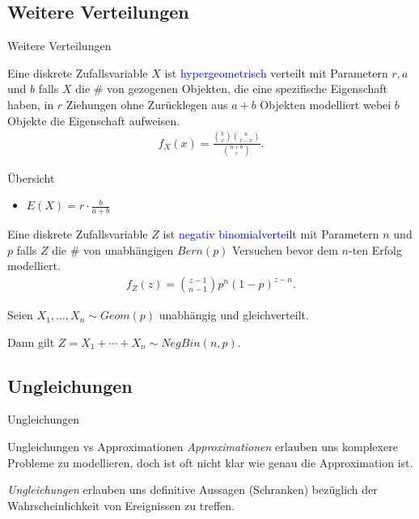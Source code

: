 \documentclass{beamer}
\def\b{\textcolor{blue}}
\begin{document}
\subsection{Weitere Verteilungen}
\begin{frame}{Weitere Verteilungen}
    \begin{definition}
        Eine diskrete Zufallsvariable $X$ ist \b{hypergeometrisch} verteilt mit Parametern $r, a$ und $b$ falls $X$ die \# von gezogenen Objekten, die eine spezifische Eigenschaft haben, in $r$ Ziehungen ohne Zurücklegen aus $a + b$ Objekten modelliert webei $b$ Objekte die Eigenschaft aufweisen.\pause
        \begin{align*}
            f_X(x) = \frac{{b \choose x}{a \choose r - x}}{{a + b \choose r}}.
        \end{align*}\pause
        \begin{exampleblock}{Übersicht}
            \begin{itemize}
                \item $E(X) = r \cdot \frac{b}{a + b}$
            \end{itemize}
        \end{exampleblock}
    \end{definition}
\end{frame}

\begin{frame}
    \begin{definition}
        Eine diskrete Zufallsvariable $Z$ ist \b{negativ binomialverteilt} mit Parametern $n$ und $p$ falls $Z$ die \# von unabhängigen $Bern(p)$ Versuchen bevor dem $n$-ten Erfolg modelliert.\pause
        \begin{align*}
            f_Z(z) = {z - 1 \choose n - 1} p^n (1 - p)^{z - n}.
        \end{align*}\pause
        \begin{example}
            Seien $X_1, \dots, X_n \sim Geom(p)$ unabhängig und gleichverteilt.\par
            Dann gilt $Z = X_1 + \cdots + X_n \sim NegBin(n,p)$.
        \end{example}
    \end{definition}
\end{frame}

\subsection{Ungleichungen}
\begin{frame}{Ungleichungen}
    \begin{block}{Ungleichungen vs Approximationen}
        \textit{Approximationen} erlauben uns komplexere Probleme zu modellieren, doch ist oft nicht klar wie genau die Approximation ist.\par\pause
        \textit{Ungleichungen} erlauben uns definitive Aussagen (Schranken) bezüglich der Wahrscheinlichkeit von Ereignissen zu treffen.
    \end{block}
\end{frame}
\end{document}
